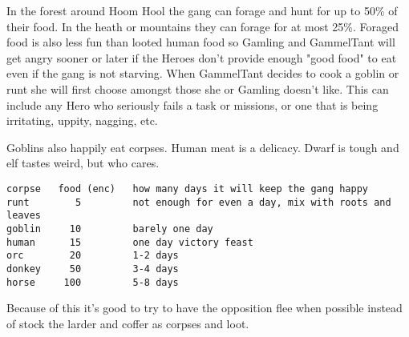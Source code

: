 In the forest around Hoom Hool the gang can forage and hunt for up to 50\% of their food. In the heath or mountains they can forage for at most 25\%. Foraged food is also less fun than looted human food so Gamling and GammelTant will get angry sooner or later if the Heroes don't provide enough "good food" to eat even if the gang is not starving.
When GammelTant decides to cook a goblin or runt she will first choose amongst those she or Gamling doesn't like. This can include any Hero who seriously fails a task or missions, or one that is being irritating, uppity, nagging, etc.

Goblins also happily eat corpses. Human meat is a delicacy. Dwarf is tough and elf tastes weird, but who cares.
\goodbreak \small \begin{samepage} \begin{verbatim}
corpse   food (enc)   how many days it will keep the gang happy
runt        5         not enough for even a day, mix with roots and leaves
goblin     10         barely one day
human      15         one day victory feast
orc        20         1-2 days
donkey     50         3-4 days
horse     100         5-8 days
\end{verbatim} \end{samepage} \normalsize
Because of this it's good to try to have the opposition flee when possible instead of stock the larder and coffer as corpses and loot.

%

%

%






